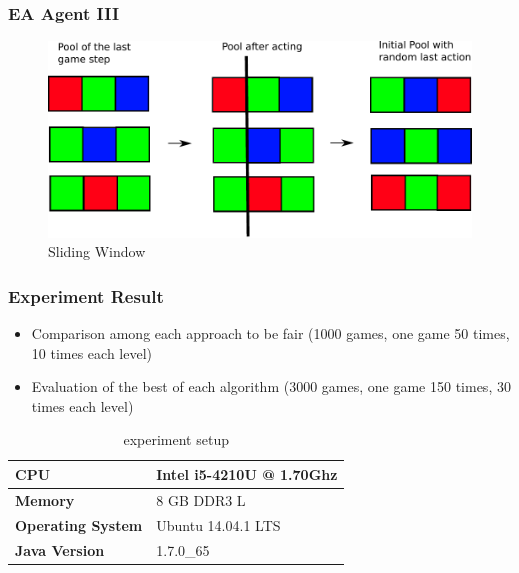 \documentclass{beamer}
\begin{document}
\begin{frame}
\frametitle{EA Agent III}
\begin{figure}[H]
\centering
\includegraphics[scale=0.6]{../report/images/sliding_window.pdf}
\caption{Sliding Window}
\label{fig:sliding_window}
\end{figure}
\end{frame}


\begin{frame}
\frametitle{Experiment Result}
\begin{itemize}
\item Comparison among each approach to be fair (1000 games, one game 50 times, 10 times each level)
\item Evaluation of the best of each algorithm (3000 games, one game 150 times, 30 times each level)
\end{itemize}

\begin{table}
\center
\begin{tabular}{ll} 
\textbf{CPU} & Intel i5-4210U @ 1.70Ghz \\ \hline
\textbf{Memory} & 8 GB DDR3 L \\  \hline
\textbf{Operating System} & Ubuntu 14.04.1 LTS \\  \hline
\textbf{Java Version} &  1.7.0\_65\\  
\end{tabular}
\caption{experiment setup}
\end{table}
\end{frame}
\end{document}
